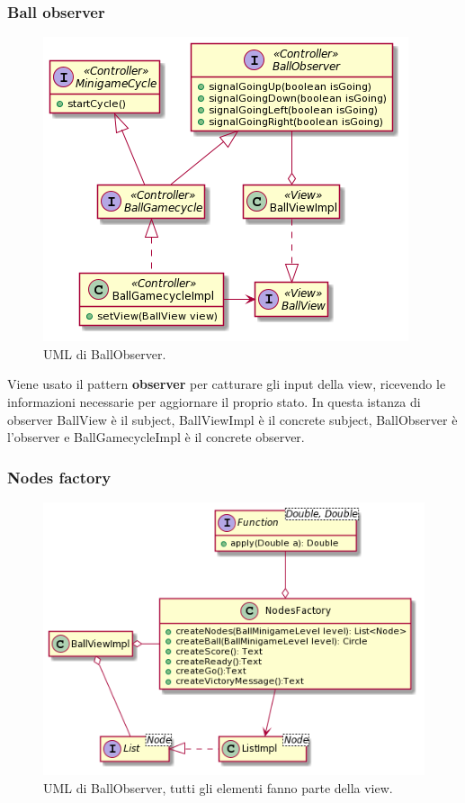 \documentclass[a4paper,12pt]{report}
\begin{document}
    \subsubsection{Ball observer}
    \begin{figure}[h]
    \centering{}
    \includegraphics[width=\textwidth]{images/freddi/BallObserver.png}
    \caption{UML di BallObserver.}
    \end{figure}

    Viene usato il pattern \textbf{observer} per catturare gli input della view, ricevendo le informazioni necessarie per aggiornare il proprio stato.
    In questa istanza di observer BallView è il subject, BallViewImpl è il concrete subject, BallObserver è l'observer e BallGamecycleImpl è il concrete observer.

    \subsubsection{Nodes factory}
    \begin{figure}[h]
    \centering{}
    \includegraphics[width=\textwidth]{images/freddi/NodesFactory.png}
    \caption{UML di BallObserver, tutti gli elementi fanno parte della view.}
    \end{figure}
\end{document}
